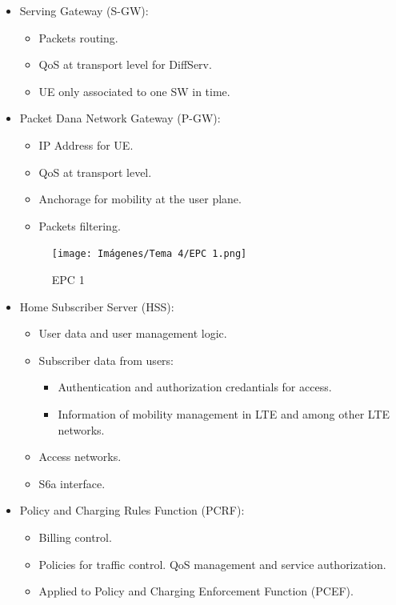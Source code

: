 \documentclass[
	12pt,
	twoside
]{book}
\begin{document}
\begin{itemize}
{\begin{itemize}
{\begin{itemize}
				\end{itemize}
			}
			\item {
				Serving Gateway (S-GW):
				\begin{itemize}
					\item Packets routing.
					\item QoS at transport level for DiffServ.
					\item UE only associated to one SW in time.
				\end{itemize}
			}
			\item {
				Packet Dana Network Gateway (P-GW):
				\begin{itemize}
					\item IP Address for UE.
					\item QoS at transport level.
					\item Anchorage for mobility at the user plane.
					\item Packets filtering.
				\end{itemize}
				\begin{figure}[H]
					\centering
					\texttt{[image: Imágenes/Tema 4/EPC 1.png]}
					\caption{
						\label{fig:unit4_LTE_EPC1}
						EPC 1
					}
				\end{figure}
			}
			\item {
				Home Subscriber Server (HSS):
				\begin{itemize}
					\item User data and user management logic.
					\item {
						Subscriber data from users:
						\begin{itemize}
							\item Authentication and authorization credantials for access.
							\item Information of mobility management in LTE and among other LTE networks.
						\end{itemize}
					}
					\item Access networks.
					\item S6a interface.
				\end{itemize}
			}
			\item {
				Policy and Charging Rules Function (PCRF):
				\begin{itemize}
					\item Billing control.
					\item Policies for traffic control. QoS management and service authorization.
					\item Applied to Policy and Charging Enforcement Function (PCEF).

\end{itemize}}
\end{itemize}}
\end{itemize}
\end{document}
